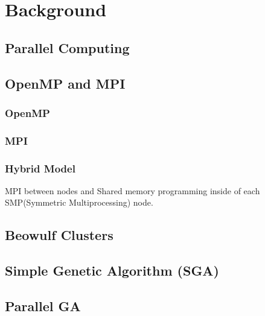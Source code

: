 \chapter{Background}
\label{background}

\section{Parallel Computing}


\section{OpenMP and MPI}
\subsection{OpenMP}


\subsection{MPI}


\subsection{Hybrid Model}
MPI between nodes and Shared memory programming inside of each SMP(Symmetric Multiprocessing) node.


\section{Beowulf Clusters}


\section{Simple Genetic Algorithm (SGA)}


\section{Parallel GA}
